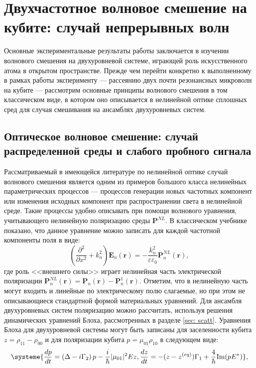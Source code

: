 \chapter{Двухчастотное волновое смешение на кубите: случай непрерывных волн}
Основные экспериментальные результаты работы заключается в изучении волнового смешения на двухуровневой системе, играющей роль искусственного атома в открытом пространстве. Прежде чем перейти конкретно к выполненному в рамках работы эксперименту --- рассеянию двух почти резонансных микроволн на кубите --- рассмотрим основные принципы волнового смешения в том классическом виде, в котором оно описывается в нелинейной оптике сплошных сред для случая смешивания на ансамблях двухуровневых систем.
\section{Оптическое волновое смешение: случай распределенной среды и слабого пробного сигнала}
Рассматриваемый в имеющейся литературе по нелинейной оптике случай волнового смешения является одним из примеров большого класса нелинейных параметрических процессов --- процессов генерации новых частотных компонент или изменения исходных компонент при распространении света в нелинейной среде. Такие процессы удобно описывать при помощи волнового уравнения, учитывающего нелинейную поляризацию среды $\mathbf{P}^{N\!L}$. В классическом учебнике \cite{boyd2003nonlinear} показано, что данное уравнение можно записать для каждой частотной компоненты поля в виде:
\begin{equation}
\left( \frac{\partial^2}{\partial x^2} + k_n^2\right) \mathbf{E}_n(\mathbf{r}) = -\frac{k_n^2}{\varepsilon\varepsilon_0}\mathbf{P}^{N\!L}_n(\mathbf{r}),
\label{eq: P_NL}
\end{equation}
где роль <<внешнего силы>> играет нелинейная часть электрической поляризации $\mathbf{P}^{N\!L}_n(\mathbf{r}) = \mathbf{P}_n(\mathbf{r}) - \mathbf{P}^{1}_n(\mathbf{r})$. Отметим, что в нелинейную часть могут входить и линейные по электрическому полю слагаемые, но при этом не описывающиеся стандартной формой материальных уравнений. Для ансамбля двухуровневых систем поляризацию можно рассчитать, используя решения динамических уравнений Блоха, рассмотренных в разделе \ref{sec: scatt}. Уравнения Блоха для двухуровневой системы могут быть записаны для заселенности кубита $z = \rho_{11}-\rho_{00}$ и для поляризации кубита $p=\mu_{01}\rho_{10}$ в следующем виде:
\begin{equation}
\systeme{\frac{dp}{dt} = \left(\Delta-i\Gamma_2\right)p -\frac{i}{\hbar}|\mu_{01}|^2Ez,
	\frac{dz}{dt} = -(z-z^{(eq)})\Gamma_1 + \frac{4}{\hbar}\text{Im}(pE^*)},
\label{eq: bloch_p_z}
\end{equation}
